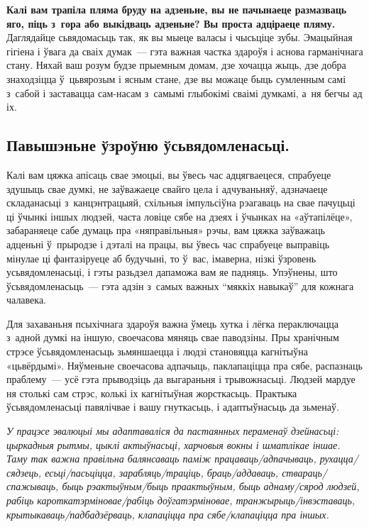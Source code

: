 \textbf{Калі вам трапіла пляма бруду на адзеньне, вы не пачынаеце размазваць яго, піць з~гора або выкідваць адзеньне? Вы проста адціраеце пляму.} Даглядайце сьвядомасьць так, як вы мыеце валасы і чысьціце зубы. Эмацыйная гігіена і ўвага да сваіх думак~--- гэта важная частка здароўя і аснова гарманічнага стану. Няхай ваш розум будзе прыемным домам, дзе хочацца жыць, дзе добра знаходзіцца ў~цьвярозым і ясным стане, дзе вы можаце быць сумленным самі з~сабой і заставацца сам-насам з~самымі глыбокімі сваімі думкамі, а~ня бегчы ад іх.

\subsection*{Павышэньне ўзроўню ўсьвядомленасьці.}

Калі вам цяжка апісаць свае эмоцыі, вы ўвесь час адцягваецеся, спрабуеце здушыць свае думкі, не заўважаеце свайго цела і адчуваньняў, адзначаеце складанасьці з~канцэнтрацыяй, схільныя імпульсіўна рэагаваць на свае пачуцьці ці ўчынкі іншых людзей, часта ловіце сябе на дзеях і ўчынках на «аўтапілёце», забараняеце сабе думаць пра «няправільныя» рэчы, вам цяжка заўважаць адценьні ў~прыродзе і дэталі на працы, вы ўвесь час спрабуеце выправіць мінулае ці фантазіруеце аб будучыні, то ў~вас, імаверна, нізкі ўзровень усьвядомленасьці, і гэты разьдзел дапаможа вам яе падняць. Упэўнены, што ўсьвядомленасьць~--- гэта адзін з~самых важных ``мяккіх навыкаў'' для кожнага чалавека.


Для захаваньня псыхічнага здароўя важна ўмець хутка і лёгка пераключацца з~адной думкі на іншую, своечасова мяняць свае паводзіны. Пры хранічным стрэсе ўсьвядомленасьць зьмяншаецца і людзі становяцца кагнітыўна «цьвёрдымі». Няўменьне своечасова адпачыць, паклапаціцца пра сябе, распазнаць праблему~--- усё гэта прыводзіць да выгараньня і трывожнасьці. Людзей мардуе ня столькі сам стрэс, колькі іх кагнітыўная жорсткасьць. Практыка ўсьвядомленасьці павялічвае і вашу гнуткасьць, і адаптыўнасьць да зьменаў.

\emph{У працэсе эвалюцыі мы адаптаваліся да пастаянных пераменаў дзейнасьці: цыркадныя рытмы, цыклі актыўнасьці, харчовыя вокны і шматлікае іншае. Таму так важна правільна балянсаваць паміж працаваць/адпачываць, рухацца/сядзець, есьці/пасьціцца, зарабляць/траціць, браць/аддаваць, ствараць/спажываць, быць рэактыўным/быць праактыўным, быць аднаму/сярод людзей, рабіць кароткатэрміновае/рабіць доўгатэрміновае, транжырыць/інвэставаць, крытыкаваць/падбадзёрваць, клапаціцца пра сябе/клапаціцца пра іншых.}


